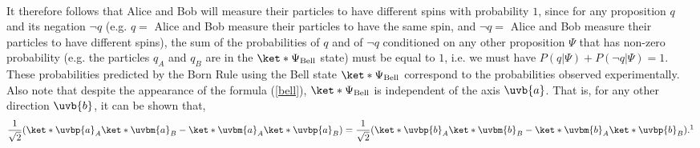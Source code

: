 \documentclass[12pt]{report}
\begin{document}
{\begin{equation*}
\begin{split}
\end{split}
\end{equation*}
It therefore follows that Alice and Bob will measure their particles to have different spins with probability $1$, since for any proposition $q$ and its negation $\neg q$ (e.g. $q =$ Alice and Bob measure their particles to have the same spin, and $\neg q = $ Alice and Bob measure their particles to have different spins), the sum of the probabilities of $q$ and of $\neg q$ conditioned on any other proposition $\Psi$ that has non-zero probability (e.g. the particles $q_A$ and $q_B$ are in the $\ket*{\Psi_{\text{Bell}}}$ state) must be equal to $1$, i.e. we must have $P(q|\Psi)+P(\neg q|\Psi)=1.$} 
These probabilities predicted by the Born Rule using the Bell state $\ket*{\Psi_{\text{Bell}}}$ correspond to the probabilities observed experimentally. Also note that despite the appearance of the formula (\ref{bell}), $\ket*{\Psi_{\text{Bell}}}$ is independent of the axis $\uvb{a}$. That is, for any other direction $\uvb{b}$, it can be shown that,
\begin{equation}\label{bellstate2}\frac{1}{\sqrt{2}}(\ket*{\uvbp{a}}_A\ket*{\uvbm{a}}_B-\ket*{\uvbm{a}}_A\ket*{\uvbp{a}}_B)=\frac{1}{\sqrt{2}}(\ket*{\uvbp{b}}_A\ket*{\uvbm{b}}_B-\ket*{\uvbm{b}}_A\ket*{\uvbp{b}}_B).\protect\footnotemark\end{equation}
\end{document}
